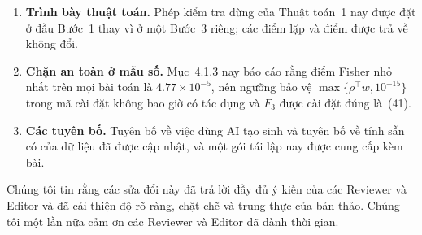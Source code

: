 \documentclass[11pt]{article}
\begin{document}
\begin{enumerate}[leftmargin=1.6em,itemsep=3pt]
  tốt hơn DTAP.
\item \textbf{Trình bày thuật toán.} Phép kiểm tra dừng của Thuật toán~1 nay được
  đặt ở đầu Bước~1 thay vì ở một Bước~3 riêng; các điểm lặp và
  điểm được trả về không đổi.
\item \textbf{Chặn an toàn ở mẫu số.} Mục~4.1.3 nay báo cáo rằng điểm Fisher
  nhỏ nhất trên mọi bài toán là $4.77\times10^{-5}$, nên ngưỡng bảo vệ $\max\{\rho^{\top}w,10^{-15}\}$
  trong mã cài đặt không bao giờ có tác dụng và $F_3$ được cài đặt đúng là~(41).
\item \textbf{Các tuyên bố.} Tuyên bố về việc dùng AI tạo sinh và tuyên bố về tính sẵn có của
  dữ liệu đã được cập nhật, và một gói tái lập nay được cung cấp kèm bài.
\end{enumerate}

\bigskip
\noindent Chúng tôi tin rằng các sửa đổi này đã trả lời đầy đủ ý kiến của các Reviewer và Editor
và đã cải thiện độ rõ ràng, chặt chẽ và trung thực của bản thảo. Chúng tôi một lần nữa cảm ơn
các Reviewer và Editor đã dành thời gian.
\end{document}
